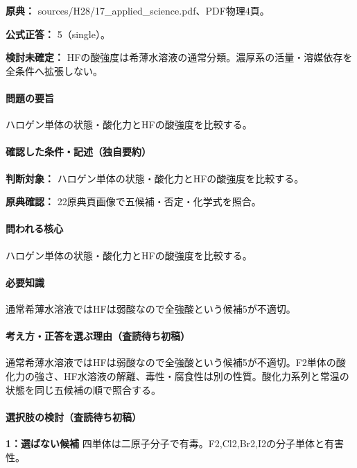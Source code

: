 \noindent\textbf{原典：} sources/H28/17\_applied\_science.pdf、PDF物理4頁。

\textbf{公式正答：} 5（single）。

\par\textbf{検討未確定：} HFの酸強度は希薄水溶液の通常分類。濃厚系の活量・溶媒依存を全条件へ拡張しない。

\paragraph{問題の要旨} ハロゲン単体の状態・酸化力とHFの酸強度を比較する。

\paragraph{確認した条件・記述（独自要約）}\mbox{}\par

\noindent\textbf{判断対象：} ハロゲン単体の状態・酸化力とHFの酸強度を比較する。\par

\noindent\textbf{原典確認：} 22原典頁画像で五候補・否定・化学式を照合。\par

\paragraph{問われる核心} ハロゲン単体の状態・酸化力とHFの酸強度を比較する。

\paragraph{必要知識} 通常希薄水溶液ではHFは弱酸なので全強酸という候補5が不適切。

\paragraph{考え方・正答を選ぶ理由（査読待ち初稿）} 通常希薄水溶液ではHFは弱酸なので全強酸という候補5が不適切。F2単体の酸化力の強さ、HF水溶液の解離、毒性・腐食性は別の性質。酸化力系列と常温の状態を同じ五候補の順で照合する。

\paragraph{選択肢の検討（査読待ち初稿）}\mbox{}\par

\noindent\textbf{1：選ばない候補} 四単体は二原子分子で有毒。F2,Cl2,Br2,I2の分子単体と有害性。\par


